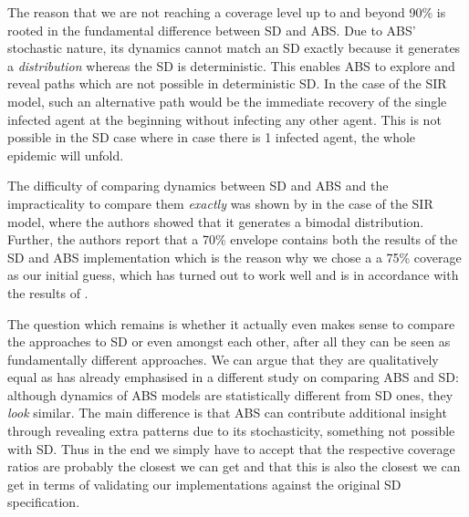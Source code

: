 \medskip

The reason that we are not reaching a coverage level up to and beyond 90\% is rooted in the fundamental difference between SD and ABS. Due to ABS' stochastic nature, its dynamics cannot match an SD exactly because it generates a \textit{distribution} whereas the SD is deterministic. This enables ABS to explore and reveal paths which are not possible in deterministic SD. In the case of the SIR model, such an alternative path would be the immediate recovery of the single infected agent at the beginning without infecting any other agent. This is not possible in the SD case where in case there is 1 infected agent, the whole epidemic will unfold.

The difficulty of comparing dynamics between SD and ABS and the impracticality to compare them \textit{exactly} was shown by \cite{macal_agent-based_2010} in the case of the SIR model, where the authors showed that it generates a bimodal distribution. Further, the authors report that a 70\% envelope contains both the results of the SD and ABS implementation which is the reason why we chose a a 75\% coverage as our initial guess, which has turned out to work well and is in accordance with the results of \cite{macal_agent-based_2010}. %

\medskip

The question which remains is whether it actually even makes sense to compare the approaches to SD or even amongst each other, after all they can be seen as fundamentally different approaches. We can argue that they are qualitatively equal as \cite{figueredo_comparing_2014} has already emphasised in a different study on comparing ABS and SD: although dynamics of ABS models are statistically different from SD ones, they \textit{look} similar. The main difference is that ABS can contribute additional insight through revealing extra patterns due to its stochasticity, something not possible with SD. Thus in the end we simply have to accept that the respective coverage ratios are probably the closest we can get and that this is also the closest we can get in terms of validating our implementations against the original SD specification.

